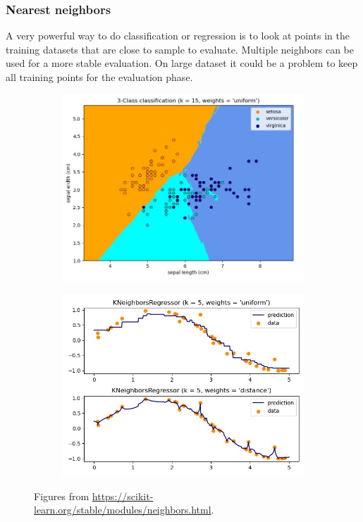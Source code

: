 \subsubsection{Nearest neighbors}

A very powerful way to do classification or regression is to look at points in the training datasets that are close to sample
to evaluate.
Multiple neighbors can be used for
a more stable evaluation.
On large dataset it could be a problem to keep all training points for the evaluation phase.


\begin{figure}[ht]
	\centering
	\begin{subfigure}{.5\textwidth}
		\centering
		\includegraphics[width=1\linewidth]{figure_ml/nn.png}
	\end{subfigure}%
	\begin{subfigure}{.5\textwidth}
		\centering
		\includegraphics[width=1\linewidth]{figure_ml/nn2.png}
	\end{subfigure}
	\caption{
		Figures from \url{https://scikit-learn.org/stable/modules/neighbors.html}.
	}
\end{figure}


